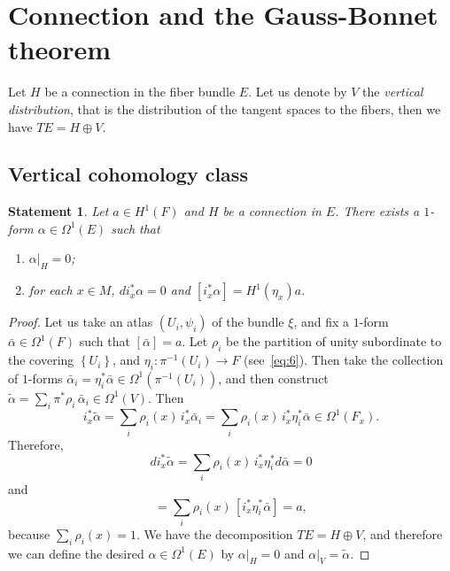 \documentclass[12pt,letterpaper]{amsart}
\theoremstyle{definition}
\theoremstyle{plain}
\newtheorem{stat}{Statement}
\theoremstyle{remark}
\begin{document}
\section{Connection and the Gauss-Bonnet theorem}
\label{sec:3}
Let $H$ be a connection in the fiber bundle $E$.
Let us denote by $V$ the \emph{vertical distribution}, that is the distribution of the tangent spaces to the fibers, then we have $TE = H \oplus V$.
\subsection{Vertical cohomology class}
\label{subsec:3_1}
\begin{stat}
Let $a \in H^1(F)$ and $H$ be a connection in $E$.
There exists a $1$-form $\alpha \in \Omega^1(E)$ such that
\begin{enumerate}
\item
$\left.\alpha\right|_H = 0$;
\item
for each $x \in M$, $d i_x^* \alpha = 0$ and $[ i_x^* \alpha ] = H^1(\eta_x) a$.
\end{enumerate}
\label{stat:1}
\end{stat}
\begin{proof}
Let us take an atlas $(U_i, \psi_i)$ of the bundle $\xi$, and fix a $1$-form $\bar\alpha \in \Omega^1(F)$ such that $[\bar\alpha] = a$.
Let $\rho_i$ be the partition of unity subordinate to the covering $\left\{ U_i \right\}$, and $\eta_i : \pi^{-1}(U_i) \to F$ (see~\eqref{eq:6}).
Then take the collection of $1$-forms $\bar\alpha_i = \eta^*_i \bar\alpha \in \Omega^1(\pi^{-1}(U_i))$, and then construct $\widetilde{\alpha} = \sum_i \pi^*\rho_i\, \bar\alpha_i \in \Omega^1(V)$.
Then
\begin{equation}
i_x^* \widetilde{\alpha} = \sum_i \rho_i(x)\, i_x^* \bar\alpha_i = \sum_i \rho_i(x)\, i_x^* \eta_i^* \bar\alpha \in \Omega^1(F_x).
\label{eq:14}
\end{equation}
Therefore,
\begin{equation}
d i_x^* \widetilde{\alpha} = \sum_i \rho_i(x)\, i_x^* \eta_i^* d\bar\alpha = 0
\label{eq:15}
\end{equation}
and
\begin{equation}
[ i_x^* \widetilde{\alpha} ] = \sum_i \rho_i(x)\, [ i_x^* \eta_i^* \bar\alpha ] = a,
\label{eq:16}
\end{equation}
because $\sum_i \rho_i(x) = 1$.
We have the decomposition $TE = H \oplus V$, and therefore we can define the desired $\alpha \in \Omega^1(E)$ by
$\left.\alpha\right|_H = 0$ and $\left.\alpha\right|_{V} = \widetilde{\alpha}$.
\end{proof}
\end{document}
